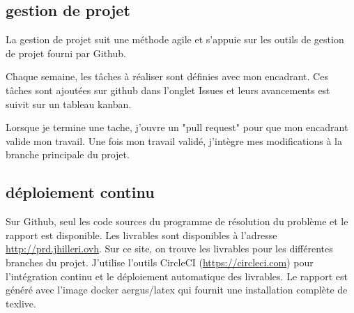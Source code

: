 \subsection{gestion de projet}
La gestion de projet suit une méthode agile et s'appuie sur les outils de gestion de projet fourni par Github.

Chaque semaine, les tâches à réaliser sont définies avec mon encadrant.
Ces tâches sont ajoutées sur github dans l'onglet Issues et leurs avancements est suivit sur un tableau kanban.

Lorsque je termine une tache, j'ouvre un "pull request" pour que mon encadrant valide mon travail.
Une fois mon travail validé, j'intègre mes modifications à la branche principale du projet.

\subsection{déploiement continu}
Sur Github, seul les code sources du programme de résolution du problème et le rapport est disponible.
Les livrables sont disponibles à l'adresse \url{http://prd.jhilleri.ovh}.
Sur ce site, on trouve les livrables pour les différentes branches du projet.
J'utilise l'outils CircleCI (\url{https://circleci.com}) pour l'intégration continu 
    et le déploiement automatique des livrables.
Le rapport est généré avec l'image docker aergus/latex qui fournit une installation complète de texlive.
